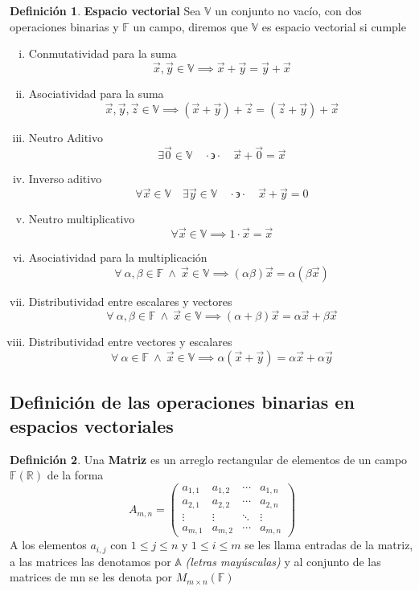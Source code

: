 \documentclass[letterpaper]{article}
\newcommand{\V}{\mathds{V}}
\newcommand{\F}{\mathds{F}}
\newcommand{\tq}{ \quad \cdot  \backepsilon \cdot \quad }
\newcommand{\R}{\mathds{R}}
\renewcommand{\*}{\cdot}
\theoremstyle{definition}
\newtheorem{definition}{Definición}[section]
\begin{document}
	\begin{definition}
		\textbf{Espacio vectorial} Sea $ \V $ un conjunto  no vacío, con dos operaciones binarias y $ \F $ un campo, diremos que $ \V $ es espacio vectorial si cumple
		\begin{enumerate}[(i)]
			\item Conmutatividad para la suma
			\[ \vec{x}, \vec{y} \in \V \implies \vec{x} + \vec{y} = \vec{y} + \vec{x} \]
			\item Asociatividad para la suma
			\[ \vec{x},\vec{y},\vec{z} \in \V \implies (\vec{x} + \vec{y}) + \vec{z} = ( \vec{z} + \vec{y}) + \vec{x}  \]
			\item Neutro Aditivo
			\[ \exists \vec{0}\in \V \tq \vec{x} + \vec{0} = \vec{x} \]
			\item Inverso aditivo 
			\[\forall \vec{x} \in \V \quad \exists \vec{y} \in \V \tq \vec{x} + \vec{y} = 0 \]
			\item Neutro multiplicativo
			\[\forall \vec{x} \in \V \implies 1\* \vec{x} = \vec{x} \]
			\item Asociatividad para la multiplicación
			\[ \forall \ \alpha, \beta \in \F \ \land \ \vec{x} \in \V \implies (\alpha \beta)\vec{x} = \alpha(\beta \vec{x}) \]
			\item Distributividad entre escalares y vectores
			\[  \forall \ \alpha, \beta \in \F \ \land \ \vec{x} \in \V \implies (\alpha + \beta)\vec{x} = \alpha \vec{x} + \beta \vec{x} \]
			\item Distributividad entre vectores y escalares
			\[  \forall \ \alpha \in \F \ \land \ \vec{x} \in \V \implies \alpha (\vec{x} + \vec{y}) = \alpha \vec{x} + \alpha \vec{y} \]	
		\end{enumerate}
	\end{definition}
	\subsection{Definición de las operaciones binarias en espacios vectoriales}
	\begin{definition}
		Una \textbf{Matriz} es un arreglo rectangular de elementos de un campo $ \F(\R) $ de la forma
		\begin{equation*}
		A_{m,n} = 
		\begin{pmatrix}
		a_{1,1} & a_{1,2} & \cdots & a_{1,n} \\
		a_{2,1} & a_{2,2} & \cdots & a_{2,n} \\
		\vdots  & \vdots  & \ddots & \vdots  \\
		a_{m,1} & a_{m,2} & \cdots & a_{m,n} 
		\end{pmatrix}
		\end{equation*}
		A los elementos $ a_{i,j} $ con $ 1 \leq j \leq n $ y $ 1 \leq i \leq m $ se les llama entradas de la matriz, a las matrices las denotamos por $ \mathds{A} $ \textit{(letras mayúsculas)} y al conjunto de las matrices de mn se les denota por $ M_{m\times n}(\F) $
	\end{definition}
	
	
\end{document}
